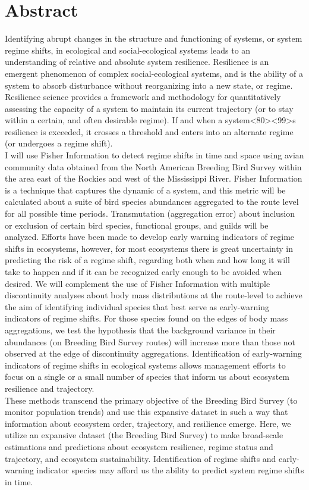 \documentclass[12pt,twoside,openany]{reedthesis}
\begin{document}
\chapter*{Abstract}\label{abstract}

Identifying abrupt changes in the structure and functioning of systems,
or system regime shifts, in ecological and social-ecological systems
leads to an understanding of relative and absolute system resilience.
Resilience is an emergent phenomenon of complex social-ecological
systems, and is the ability of a system to absorb disturbance without
reorganizing into a new state, or regime. Resilience science provides a
framework and methodology for quantitatively assessing the capacity of a
system to maintain its current trajectory (or to stay within a certain,
and often desirable regime). If and when a
system\textless{}80\textgreater{}\textless{}99\textgreater{}s resilience
is exceeded, it crosses a threshold and enters into an alternate regime
(or undergoes a regime shift).\\
I will use Fisher Information to detect regime shifts in time and space
using avian community data obtained from the North American Breeding
Bird Survey within the area east of the Rockies and west of the
Mississippi River. Fisher Information is a technique that captures the
dynamic of a system, and this metric will be calculated about a suite of
bird species abundances aggregated to the route level for all possible
time periods. Transmutation (aggregation error) about inclusion or
exclusion of certain bird species, functional groups, and guilds will be
analyzed. Efforts have been made to develop early warning indicators of
regime shifts in ecosystems, however, for most ecosystems there is great
uncertainty in predicting the risk of a regime shift, regarding both
when and how long it will take to happen and if it can be recognized
early enough to be avoided when desired. We will complement the use of
Fisher Information with multiple discontinuity analyses about body mass
distributions at the route-level to achieve the aim of identifying
individual species that best serve as early-warning indicators of regime
shifts. For those species found on the edges of body mass aggregations,
we test the hypothesis that the background variance in their abundances
(on Breeding Bird Survey routes) will increase more than those not
observed at the edge of discontinuity aggregations. Identification of
early-warning indicators of regime shifts in ecological systems allows
management efforts to focus on a single or a small number of species
that inform us about ecosystem resilience and trajectory.\\
These methods transcend the primary objective of the Breeding Bird
Survey (to monitor population trends) and use this expansive dataset in
such a way that information about ecosystem order, trajectory, and
resilience emerge. Here, we utilize an expansive dataset (the Breeding
Bird Survey) to make broad-scale estimations and predictions about
ecosystem resilience, regime status and trajectory, and ecosystem
sustainability. Identification of regime shifts and early-warning
indicator species may afford us the ability to predict system regime
shifts in time.
\end{document}

